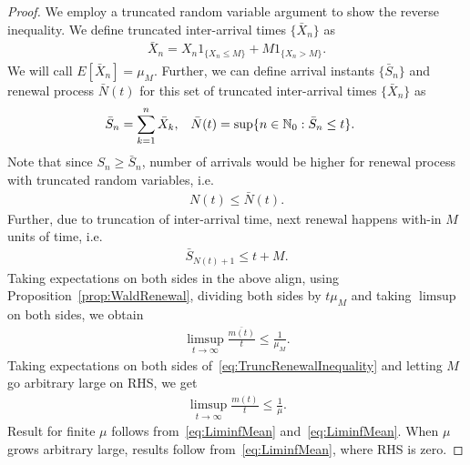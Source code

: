 \documentclass[a4paper,10pt, english]{article}
\begin{document}
\begin{proof}
	We employ a truncated random variable argument to show the reverse inequality. We define truncated inter-arrival times $\{\bar{X}_n\}$ as 
	\begin{align*}
	\bar{X}_n = X_n 1_{\{X_n \leq M\}} + M1_{\{X_n > M\}}.
	\end{align*}
	We will call $E[\bar{X}_n] = \mu_M$. Further, we can define arrival instants $\{\bar{S}_n\}$ and renewal process $\bar{N}(t)$ for this set of truncated inter-arrival times $\{\bar{X}_n\}$ as 
	\begin{align*}
	\bar{S}_n &= \sum_{k=1}^n \bar{X}_k, & \bar{N}(t) &= \sup\{n \in \mathbb{N}_0: \bar{S}_n \leq t\}.
	\end{align*}
	Note that since $S_n \geq \bar{S}_n$, number of arrivals would be higher for renewal process with truncated random variables, i.e. 
	\begin{align}
	\label{eq:TruncRenewalInequality}
	N(t) \leq \bar{N}(t).
	\end{align}
	Further, due to truncation of inter-arrival time, next renewal happens with-in $M$ units of time, i.e.
	\begin{align*}
	\bar{S}_{N(t)+1} \leq t+M.
	\end{align*}
	Taking expectations on both sides in the above align, using Proposition~\ref{prop:WaldRenewal}, dividing both sides by $t \mu_M$ and taking $\limsup$ on both sides, we obtain
	\begin{align*}
	\limsup_{t \to \infty}\frac{\bar{m(t)}}{t} \leq \frac{1}{\mu_M}.
	\end{align*}
	Taking expectations on both sides of~\eqref{eq:TruncRenewalInequality} and letting $M$ go arbitrary large on RHS, we get
	\begin{align}
	\label{eq:LimsupMean}
	\limsup_{t \to \infty}\frac{m(t)}{t} \leq \frac{1}{\mu}.
	\end{align}
	Result for finite $\mu$ follows from~\eqref{eq:LiminfMean} and~\eqref{eq:LiminfMean}. When $\mu$ grows arbitrary large, results follow from~\eqref{eq:LiminfMean}, where RHS is zero. 
\end{proof}
\end{document}
